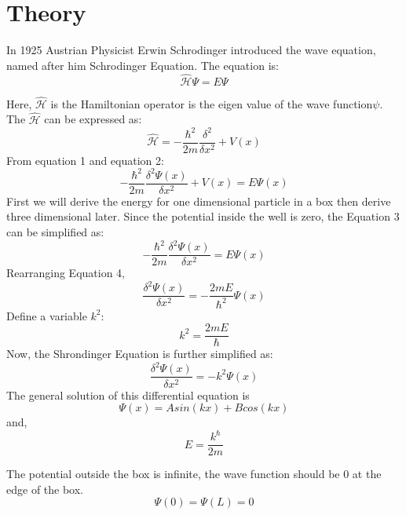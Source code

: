\documentclass[12pt]{report}
\newcommand*{\hatH}{\hat{\mathcal{H}}}
\begin{document}
\section{Theory}
In 1925 Austrian Physicist Erwin Schrodinger introduced the wave equation, named after him Schrodinger Equation. The equation is:
\begin{equation}
    \hatH \Psi = E \Psi          
\end{equation}

Here, $\hatH$ is the Hamiltonian operator is the eigen value of the wave function$\psi$. The $\hatH$ can be expressed as:
\begin{equation}
    \hatH = - \frac{\hbar^2}{2m} \frac{\delta^2}{\delta x^2} + V(x)
\end{equation}
 From equation 1 and equation 2:
 \begin{equation}
    - \frac{\hbar^2}{2m} \frac{\delta^2 \Psi(x)}{\delta x^2} + V(x) = E \Psi(x)
 \end{equation}
First we will derive the energy for one dimensional particle in a box then derive three dimensional later. Since the potential inside the well is zero, the Equation 3 can be simplified as:
\begin{equation}
     - \frac{\hbar^2}{2m} \frac{\delta^2 \Psi(x)}{\delta x^2} = E \Psi(x)
\end{equation}
Rearranging Equation 4,
\begin{equation}
    \frac{\delta^2 \Psi(x)}{\delta x^2} =  - \frac{2mE}{\hbar^2} \Psi(x)
\end{equation}
Define a variable $k^2$:
\begin{equation}
    k^2 = \frac{2mE}{\hbar}
\end{equation}
Now, the Shrondinger Equation is further simplified as:
\begin{equation}
    \frac{\delta^2 \Psi(x)}{\delta x^2} =  -k^2 \Psi(x)
\end{equation}
The general solution of this differential equation is
\begin{equation}
    \Psi(x) = Asin(kx) + Bcos(kx)
\end{equation}
and,
\begin{equation}
      E = \frac{k^\hbar}{2m}
\end{equation}

The potential outside the box is infinite, the wave function should be 0 at the edge of the box. 
\begin{equation}
    \Psi(0) = \Psi(L) = 0
\end{equation}
\end{document}
